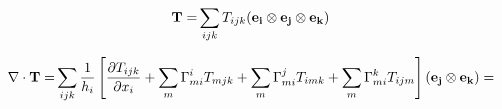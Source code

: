\documentclass[11pt]{article}
\begin{document}
\begin{landscape}
\maketitle

\vspace{-1.cm}

\begin{align}
{\bf{T}} = &  \sum_{ijk} T_{ijk} ({\bf{e_i}} \otimes {\bf{e_j}} \otimes {\bf{e_k}})
\end{align}

\begin{align}
\nabla \cdot {\bf{T}} = & \sum_{ijk} \frac{1}{h_i} \left[ \frac{\partial T_{ijk}}{\partial x_i} + \sum_m \Gamma_{mi}^i T_{mjk} + \sum_m \Gamma_{mi}^j T_{imk} + \sum_m \Gamma_{mi}^k T_{ijm} \right]  ({\bf{e_j}} \otimes {\bf{e_k}}) = 
\end{align}


\end{landscape}
\end{document}
